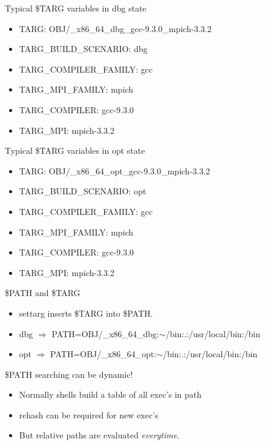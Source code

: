 \documentclass{beamer}
\begin{document}
\begin{frame}{Typical \$TARG variables in dbg state}
  \begin{itemize}
    \item TARG: OBJ/\_x86\_64\_dbg\_gcc-9.3.0\_mpich-3.3.2
    \item TARG\_BUILD\_SCENARIO: dbg
    \item TARG\_COMPILER\_FAMILY: gcc
    \item TARG\_MPI\_FAMILY: mpich
    \item TARG\_COMPILER: gcc-9.3.0
    \item TARG\_MPI:   mpich-3.3.2
  \end{itemize}
\end{frame}

\begin{frame}{Typical \$TARG variables in opt state}
  \begin{itemize}
    \item TARG: OBJ/\_x86\_64\_opt\_gcc-9.3.0\_mpich-3.3.2
    \item TARG\_BUILD\_SCENARIO: opt
    \item TARG\_COMPILER\_FAMILY: gcc
    \item TARG\_MPI\_FAMILY: mpich
    \item TARG\_COMPILER: gcc-9.3.0
    \item TARG\_MPI:   mpich-3.3.2
  \end{itemize}
\end{frame}

\begin{frame}{\$PATH and \$TARG}
  \begin{itemize}
    \item settarg inserts \$TARG into \$PATH.
    \item dbg $\Rightarrow$ PATH=OBJ/\_x86\_64\_dbg:$\sim$/bin:.:/usr/local/bin:/bin
    \item opt $\Rightarrow$ PATH=OBJ/\_x86\_64\_opt:$\sim$/bin:.:/usr/local/bin:/bin
  \end{itemize}
\end{frame}

\begin{frame}{\$PATH searching can be dynamic!}
  \begin{itemize}
    \item Normally shells build a table of all exec's in path
    \item rehash can be required for new exec's
    \item But relative paths are evaluated \emph{everytime}.
  \end{itemize}
\end{frame}
\end{document}
